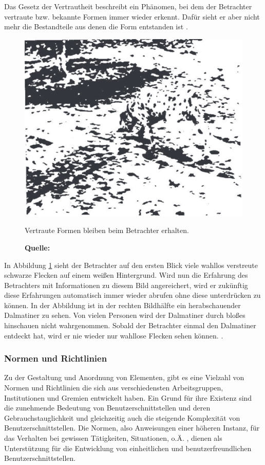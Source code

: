 Das Gesetz der Vertrautheit beschreibt ein Phänomen, bei dem der Betrachter vertraute bzw. bekannte Formen immer wieder erkennt. Dafür sieht er aber nicht mehr die Bestandteile aus denen die Form entstanden ist \citep[vgl.][63f]{Dahm2006}.
\begin{figure}[H]
  \centering
  \includegraphics[scale=0.7]{img/gesetz_der_Vertrautheit.PNG}
  \caption{Vertraute Formen bleiben beim Betrachter erhalten.}
  \caption*{\textbf{Quelle:} \citep{Dahm2006}}
  \label{fig:vertrautheit}
\end{figure}
In Abbildung \ref{fig:vertrautheit} sieht der Betrachter auf den ersten Blick viele wahllos verstreute schwarze Flecken auf einem weißen Hintergrund. Wird nun die Erfahrung des Betrachters mit Informationen zu diesem Bild angereichert, wird er zukünftig diese Erfahrungen automatisch immer wieder abrufen ohne diese unterdrücken zu können. In der Abbildung ist in der rechten Bildhälfte ein herabschauender Dalmatiner zu sehen. Von vielen Personen wird der Dalmatiner durch bloßes hinschauen nicht wahrgenommen. Sobald der Betrachter einmal den Dalmatiner entdeckt hat, wird er nie wieder nur wahllose Flecken sehen können. \citep[vgl.][63f]{Dahm2006}.

\subsubsection{Normen und Richtlinien}
Zu der Gestaltung und Anordnung von Elementen, gibt es eine Vielzahl von Normen und Richtlinien die sich aus verschiedensten Arbeitsgruppen, Institutionen und Gremien entwickelt haben. Ein Grund für ihre Existenz sind die zunehmende Bedeutung von Benutzerschnittstellen und deren Gebrauchstauglichkeit und gleichzeitig auch die steigende Komplexität von Benutzerschnittstellen. Die Normen, also Anweisungen einer höheren Instanz, für das Verhalten bei gewissen Tätigkeiten, Situationen, o.Ä. \citep[vgl.][]{duden}, dienen als Unterstützung für die Entwicklung von einheitlichen und benutzerfreundlichen Benutzerschnittstellen. 

